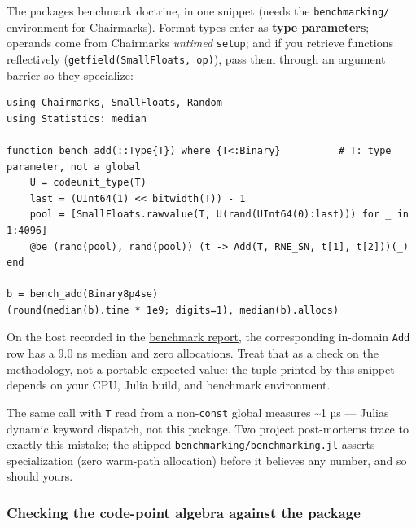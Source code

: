 \label{585007679975857547}{}


The package{\textquotesingle}s benchmark doctrine, in one snippet (needs the \texttt{benchmarking/} environment for Chairmarks). Format types enter as \textbf{type parameters}; operands come from Chairmarks{\textquotesingle} \emph{untimed} \texttt{setup}; and if you retrieve functions reflectively (\texttt{getfield(\allowbreak{}SmallFloats, op)}), pass them through an argument barrier so they specialize:




\nopagebreak[4]
\begin{verbatim}
using Chairmarks, SmallFloats, Random
using Statistics: median

function bench_add(::Type{T}) where {T<:Binary}          # T: type parameter, not a global
    U = codeunit_type(T)
    last = (UInt64(1) << bitwidth(T)) - 1
    pool = [SmallFloats.rawvalue(T, U(rand(UInt64(0):last))) for _ in 1:4096]
    @be (rand(pool), rand(pool)) (t -> Add(T, RNE_SN, t[1], t[2]))(_)
end

b = bench_add(Binary8p4se)
(round(median(b).time * 1e9; digits=1), median(b).allocs)
\end{verbatim}



On the host recorded in the \href{examples\_\allowbreak{}performance.md}{benchmark report}, the corresponding in-domain \texttt{Add} row has a 9.0 ns median and zero allocations. Treat that as a check on the methodology, not a portable expected value: the tuple printed by this snippet depends on your CPU, Julia build, and benchmark environment.



\begin{tcolorbox}[toptitle=-1mm,bottomtitle=1mm,colback=admonition-warning!50!white,colframe=admonition-warning,title=\textbf{The 60× misapplication}]
The same call with \texttt{T} read from a non-\texttt{const} global measures {\textasciitilde}1 µs — Julia{\textquotesingle}s dynamic keyword dispatch, not this package. Two project post-mortems trace to exactly this mistake; the shipped \texttt{benchmarking/\allowbreak{}benchmarking.jl} asserts specialization (zero warm-path allocation) before it believes any number, and so should yours.

\end{tcolorbox}


\subsubsection{Checking the code-point algebra against the package}



